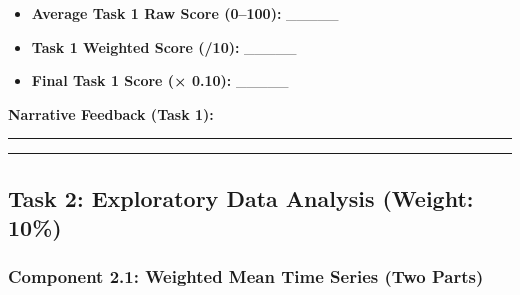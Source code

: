 \documentclass[
  10pt,
]{article}
\providecommand{\tightlist}{%
  \setlength{\itemsep}{0pt}\setlength{\parskip}{0pt}}
\begin{document}
\begin{itemize}
\tightlist
\item
  \textbf{Average Task 1 Raw Score (0--100):} \_\_\_\_\_\\
\item
  \textbf{Task 1 Weighted Score (/10):} \_\_\_\_\_\\
\item
  \textbf{Final Task 1 Score (× 0.10):} \_\_\_\_\_
\end{itemize}

\textbf{Narrative Feedback (Task 1):}

\begin{center}\rule{0.5\linewidth}{0.5pt}\end{center}

\begin{center}\rule{0.5\linewidth}{0.5pt}\end{center}

\subsection{Task 2: Exploratory Data Analysis (Weight:
10\%)}\label{task-2-exploratory-data-analysis-weight-10}

\subsubsection{Component 2.1: Weighted Mean Time Series (Two
Parts)}\label{component-2.1-weighted-mean-time-series-two-parts}
\end{document}
